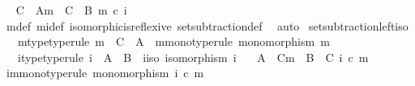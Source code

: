\begin{isabellebody}
\ \isamarkupfalse%
\ {\isachardoublequoteopen}C\ {\isasymsetminus}\ {\isacharparenleft}{\kern0pt}A{\isacharcomma}{\kern0pt}m{\isacharparenright}{\kern0pt}\ {\isacharequal}{\kern0pt}\ C\ {\isasymsetminus}\ {\isacharparenleft}{\kern0pt}B{\isacharcomma}{\kern0pt}\ m\ {\isasymcirc}\isactrlsub c\ i{\isacharparenright}{\kern0pt}{\isachardoublequoteclose}\isanewline
\ \ \ \ \isamarkupfalse%
\ {\isasymchi}m{\isacharunderscore}{\kern0pt}def\ {\isasymchi}mi{\isacharunderscore}{\kern0pt}def\ isomorphic{\isacharunderscore}{\kern0pt}is{\isacharunderscore}{\kern0pt}reflexive\ set{\isacharunderscore}{\kern0pt}subtraction{\isacharunderscore}{\kern0pt}def\ \isamarkupfalse%
\ auto\isanewline
{}\isamarkupfalse%
%
\endisatagproof
{\isafoldproof}%
%
\isadelimproof
\isanewline
%
\endisadelimproof
\isanewline
{}\isamarkupfalse%
\ set{\isacharunderscore}{\kern0pt}subtraction{\isacharunderscore}{\kern0pt}left{\isacharunderscore}{\kern0pt}iso{\isacharcolon}{\kern0pt}\isanewline
\ \ \ m{\isacharunderscore}{\kern0pt}type{\isacharbrackleft}{\kern0pt}type{\isacharunderscore}{\kern0pt}rule{\isacharbrackright}{\kern0pt}{\isacharcolon}{\kern0pt}\ {\isachardoublequoteopen}m\ {\isacharcolon}{\kern0pt}\ C\ {\isasymrightarrow}\ A{\isachardoublequoteclose}\ \ m{\isacharunderscore}{\kern0pt}mono{\isacharbrackleft}{\kern0pt}type{\isacharunderscore}{\kern0pt}rule{\isacharbrackright}{\kern0pt}{\isacharcolon}{\kern0pt}\ {\isachardoublequoteopen}monomorphism\ m{\isachardoublequoteclose}\isanewline
\ \ \ i{\isacharunderscore}{\kern0pt}type{\isacharbrackleft}{\kern0pt}type{\isacharunderscore}{\kern0pt}rule{\isacharbrackright}{\kern0pt}{\isacharcolon}{\kern0pt}\ {\isachardoublequoteopen}i\ {\isacharcolon}{\kern0pt}\ A\ {\isasymrightarrow}\ B{\isachardoublequoteclose}\ \ i{\isacharunderscore}{\kern0pt}iso{\isacharcolon}{\kern0pt}\ {\isachardoublequoteopen}isomorphism\ i{\isachardoublequoteclose}\isanewline
\ \ \ {\isachardoublequoteopen}A\ {\isasymsetminus}\ {\isacharparenleft}{\kern0pt}C{\isacharcomma}{\kern0pt}m{\isacharparenright}{\kern0pt}\ {\isasymcong}\ B\ {\isasymsetminus}\ {\isacharparenleft}{\kern0pt}C{\isacharcomma}{\kern0pt}\ i\ {\isasymcirc}\isactrlsub c\ m{\isacharparenright}{\kern0pt}{\isachardoublequoteclose}\isanewline
%
\isadelimproof
%
\endisadelimproof
%
\isatagproof
{}\isamarkupfalse%
\ {\isacharminus}{\kern0pt}\isanewline
\ \ \isamarkupfalse%
\ im{\isacharunderscore}{\kern0pt}mono{\isacharbrackleft}{\kern0pt}type{\isacharunderscore}{\kern0pt}rule{\isacharbrackright}{\kern0pt}{\isacharcolon}{\kern0pt}\ {\isachardoublequoteopen}monomorphism\ {\isacharparenleft}{\kern0pt}i\ {\isasymcirc}\isactrlsub c\ m{\isacharparenright}{\kern0pt}{\isachardoublequoteclose}\isanewline

\end{isabellebody}
